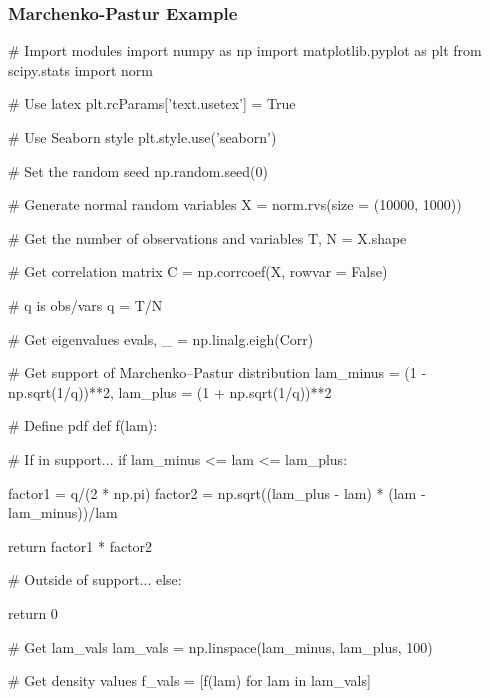 \documentclass{beamer}
\begin{document}
\begin{frame}[fragile]
\frametitle{Marchenko-Pastur Example}

\begin{multicols}{2}

\linespread{0.8}
\tiny
\begin{verbatim*}
# Import modules
import numpy as np
import matplotlib.pyplot as plt
from scipy.stats import norm

# Use latex
plt.rcParams['text.usetex'] = True

# Use Seaborn style
plt.style.use('seaborn')

# Set the random seed
np.random.seed(0)

# Generate normal random variables
X = norm.rvs(size = (10000, 1000))

# Get the number of observations and variables
T, N = X.shape

# Get correlation matrix
C = np.corrcoef(X, rowvar = False)

# q is obs/vars
q = T/N

# Get eigenvalues
evals, _ = np.linalg.eigh(Corr)

# Get support of Marchenko–Pastur distribution
lam_minus = (1 - np.sqrt(1/q))**2,
lam_plus = (1 + np.sqrt(1/q))**2 

# Define pdf
def f(lam):
    
    # If in support... 
    if lam_minus <= lam <= lam_plus:
        
        factor1 = q/(2 * np.pi)
        factor2 = np.sqrt((lam_plus - lam) 
          * (lam - lam_minus))/lam
        
        return factor1 * factor2
     
     # Outside of support...          
    else:
                
        return 0

# Get lam_vals
lam_vals = np.linspace(lam_minus, lam_plus, 100)

# Get density values
f_vals = [f(lam) for lam in lam_vals]
\end{verbatim*}

\end{multicols}

\end{frame}
\end{document}
